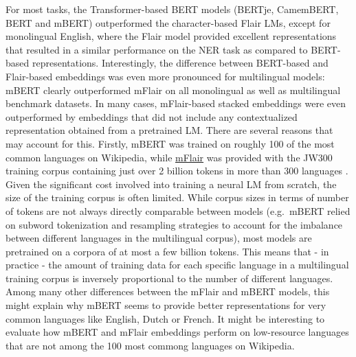 \documentclass[12pt,a4paper,]{book}
\begin{document}
For most tasks, the Transformer-based BERT models (BERTje, CamemBERT, BERT and mBERT) outperformed the character-based Flair LMs, except for monolingual English, where the Flair model provided excellent representations that resulted in a similar performance on the NER task as compared to BERT-based representations. Interestingly, the difference between BERT-based and Flair-based embeddings was even more pronounced for multilingual models: mBERT clearly outperformed mFlair on all monolingual as well as multilingual benchmark datasets. In many cases, mFlair-based stacked embeddings were even outperformed by embeddings that did not include any contextualized representation obtained from a pretrained LM. There are several reasons that may account for this. Firstly, mBERT was trained on roughly 100 of the most common languages on Wikipedia, while \href{https://github.com/flairNLP/flair/issues/1099}{mFlair} was provided with the JW300 training corpus containing just over 2 billion tokens in more than 300 languages \citep{agic2019}. Given the significant cost involved into training a neural LM from scratch, the size of the training corpus is often limited. While corpus sizes in terms of number of tokens are not always directly comparable between models (e.g.~mBERT relied on subword tokenization and resampling strategies to account for the imbalance between different languages in the multilingual corpus), most models are pretrained on a corpora of at most a few billion tokens. This means that - in practice - the amount of training data for each specific language in a multilingual training corpus is inversely proportional to the number of different languages. Among many other differences between the mFlair and mBERT models, this might explain why mBERT seems to provide better representations for very common languages like English, Dutch or French. It might be interesting to evaluate how mBERT and mFlair embeddings perform on low-resource languages that are not among the 100 most commong languages on Wikipedia.
\end{document}

